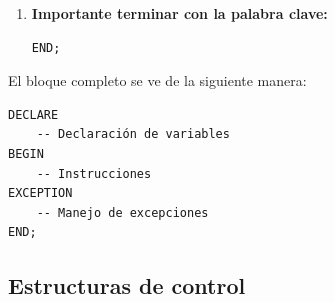 \documentclass{templateNote}
\begin{document}
\begin{enumerate}
    \item \textbf{Importante terminar con la palabra clave:}
    \begin{tcolorbox}[
        colframe=red!90!black, %
        colback=red!20,       %
        coltitle=white!100, %
        title=\textbf{PL/SQL}, %
    ]
    \begin{Verbatim}[breaklines=true]
END;
        \end{Verbatim}
    \end{tcolorbox}
\end{enumerate}
El bloque completo se ve de la siguiente manera:
\begin{tcolorbox}[
    colframe=Verde!100, %
    colback=Verde!20,       %
    coltitle=black!100, %
    title=\textbf{PL/SQL}, %
]
\begin{Verbatim}[breaklines=true]
DECLARE
    -- Declaración de variables
BEGIN
    -- Instrucciones
EXCEPTION
    -- Manejo de excepciones
END;
    \end{Verbatim}
\end{tcolorbox}

\newpage
\subsection{Estructuras de control}
\end{document}
